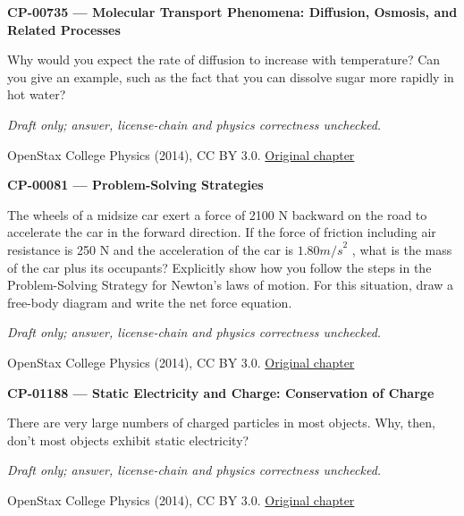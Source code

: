 \par\medskip
\noindent\textbf{CP-00735 — Molecular Transport Phenomena: Diffusion, Osmosis, and Related Processes}
\par Why would you expect the rate of diffusion to increase with temperature? Can you give an example, such as the fact that you can dissolve sugar more rapidly in hot water?
\par\smallskip
\textit{Draft only; answer, license-chain and physics correctness unchecked.}
\par{\footnotesize OpenStax College Physics (2014), CC BY 3.0. \href{https://github.com/philschatz/physics-book/blob/a7efaa7e221fab1694022d8bb98b83a73ee31d3d/contents/m42212.md}{Original chapter}}\par\normalsize

\par\medskip
\noindent\textbf{CP-00081 — Problem-Solving Strategies}
\par The wheels of a midsize car exert a force of 2100 N backward on the road to accelerate the car in the forward direction. If the force of friction including air resistance is 250 N and the acceleration of the car is $1.{80 m/s}^{2}$ , what is the mass of the car plus its occupants? Explicitly show how you follow the steps in the Problem-Solving Strategy for Newton’s laws of motion. For this situation, draw a free-body diagram and write the net force equation.
\par\smallskip
\textit{Draft only; answer, license-chain and physics correctness unchecked.}
\par{\footnotesize OpenStax College Physics (2014), CC BY 3.0. \href{https://github.com/philschatz/physics-book/blob/a7efaa7e221fab1694022d8bb98b83a73ee31d3d/contents/m42076.md}{Original chapter}}\par\normalsize

\par\medskip
\noindent\textbf{CP-01188 — Static Electricity and Charge: Conservation of Charge}
\par There are very large numbers of charged particles in most objects. Why, then, don’t most objects exhibit static electricity?
\par\smallskip
\textit{Draft only; answer, license-chain and physics correctness unchecked.}
\par{\footnotesize OpenStax College Physics (2014), CC BY 3.0. \href{https://github.com/philschatz/physics-book/blob/a7efaa7e221fab1694022d8bb98b83a73ee31d3d/contents/m42300.md}{Original chapter}}\par\normalsize

